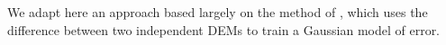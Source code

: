 \documentclass[12pt]{article}
\begin{document}
We adapt here an approach based largely on the method of
\citet{Ehlschlaeger_1996}, which uses the difference between two
independent DEMs to train a Gaussian model of error.

%
%
%
\end{document}
